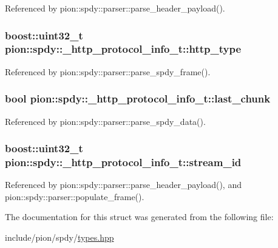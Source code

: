 Referenced by pion\-::spdy\-::parser\-::parse\-\_\-header\-\_\-payload().

\hypertarget{structpion_1_1spdy_1_1__http__protocol__info__t_a2b40596ec08c3f01e3b42a3c9f46144f}{
\subsubsection[{http\-\_\-type}]{\setlength{\rightskip}{0pt plus 5cm}boost\-::uint32\-\_\-t pion\-::spdy\-::\-\_\-http\-\_\-protocol\-\_\-info\-\_\-t\-::http\-\_\-type}}\label{structpion_1_1spdy_1_1__http__protocol__info__t_a2b40596ec08c3f01e3b42a3c9f46144f}


Referenced by pion\-::spdy\-::parser\-::parse\-\_\-spdy\-\_\-frame().

\hypertarget{structpion_1_1spdy_1_1__http__protocol__info__t_ab497d1956139ddbe0773fe6515ef72c7}{
\subsubsection[{last\-\_\-chunk}]{\setlength{\rightskip}{0pt plus 5cm}bool pion\-::spdy\-::\-\_\-http\-\_\-protocol\-\_\-info\-\_\-t\-::last\-\_\-chunk}}\label{structpion_1_1spdy_1_1__http__protocol__info__t_ab497d1956139ddbe0773fe6515ef72c7}


Referenced by pion\-::spdy\-::parser\-::parse\-\_\-spdy\-\_\-data().

\hypertarget{structpion_1_1spdy_1_1__http__protocol__info__t_a17e4bd218ca2af1c9441c4d78b33c91a}{
\subsubsection[{stream\-\_\-id}]{\setlength{\rightskip}{0pt plus 5cm}boost\-::uint32\-\_\-t pion\-::spdy\-::\-\_\-http\-\_\-protocol\-\_\-info\-\_\-t\-::stream\-\_\-id}}\label{structpion_1_1spdy_1_1__http__protocol__info__t_a17e4bd218ca2af1c9441c4d78b33c91a}


Referenced by pion\-::spdy\-::parser\-::parse\-\_\-header\-\_\-payload(), and pion\-::spdy\-::parser\-::populate\-\_\-frame().



The documentation for this struct was generated from the following file\-:\begin{DoxyCompactItemize}
\item 
include/pion/spdy/\hyperlink{spdy_2types_8hpp}{types.\-hpp}\end{DoxyCompactItemize}
